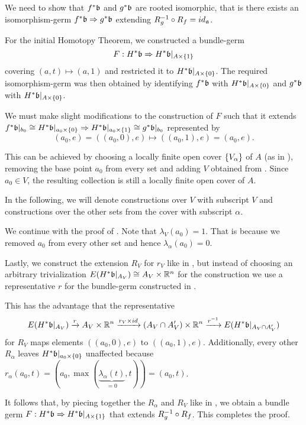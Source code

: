 \begin{myproof}
    We need to show that $\ind{f}\bb$ and $\ind{g}\bb$ are rooted isomorphic,
    that is there exists an isomorphism-germ $\germ{\ind{f}\bb}{\ind{g}\bb}$
    extending $R_g^{-1} \circ R_f = id_{\mathfrak{a}}$.

    For the initial Homotopy Theorem,
    we constructed a bundle-germ
    \[ \germdef{F}{\ind{H}\bb}{\ind{H}\bb[\cylup{A}]} \]
    covering $(a, t) \mapsto (a, 1)$
    and restricted it to $\ind{H}\bb[\cyldown{A}]$.
    The required isomorphism-germ was then obtained by
    identifying $\ind{f}\bb$ with $\ind{H}\bb[\cyldown{A}]$ and
    $\ind{g}\bb$ with $\ind{H}\bb[\cyldown{A}]$.

    We must make slight modifications
    to the construction of $F$ such that it extends
    $\germ{\ind{f}\bbb \cong \ind{H}\bb[\cyldown{a_0}]}{\ind{H}\bb[\cylup{a_0}] \cong \ind{g}\bbb}$
    represented by
    \[ (a_0, e) = ((a_0, 0), e) \mapsto ((a_0, 1), e) = (a_0, e). \]

    This can be achieved by choosing a locally finite open cover $\{V_\alpha\}$
    of $A$ (as in ), removing the base point $a_0$ from every set
    and adding $V$ obtained from .
    Since $a_0 \in V$, the resulting collection is still a
    locally finite open cover of $A$.
    
    In the following, we will denote constructions over $V$
    with subscript $V$ and constructions over the other sets
    from the cover with subscript $\alpha$.

    We continue with the proof of .
    Note that $\lambda_V(a_0) = 1$.
    That is because we removed $a_0$ from every other set and hence $\lambda_\alpha(a_0) = 0$.

    Lastly, we construct the extension $R_V$ for $r_V$
    like in ,
    but instead of choosing an arbitrary trivialization
    $E(\ind{H}\bb\restr{A_V}) \cong A_V \cross \R^n$
    for the construction we use a representative $r$
    for the bundle-germ constructed in .
    
    This has the advantage that the representative
    \[
        E(\ind{H}\bb[A_V]) \xto{r}
        A_V \cross \R^n \xto{r_V \cross id} (A_V \cap A'_V) \cross \R^n
        \xto{\inv{r}} E(\ind{H}\bb[A_V \cap A'_V])
    \]
    for $R_V$ maps elements $((a_0, 0), e)$ to $((a_0, 1), e)$.
    Additionally,
    every other $R_\alpha$ leaves $\ind{H}\bb[\cyldown{a_0}]$ unaffected
    because $r_\alpha(a_0, t) = (a_0, \max(\underbrace{\lambda_\alpha(t)}_{= 0}, t)) = (a_0, t)$.

    It follows that, by piecing together the $R_\alpha$ and $R_V$ like in ,
    we obtain a bundle germ $\germdef{F}{\ind{H}\bb}{\ind{H}\bb[\cylup{A}]}$
    that extends $R_g^{-1} \circ R_f$.
    This completes the proof.
\end{myproof}